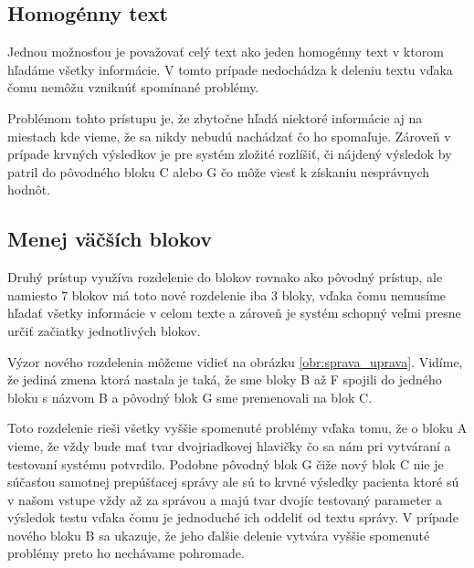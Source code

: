 \subsection{Homogénny text}

Jednou možnosťou je považovať celý text ako jeden homogénny text v ktorom hľadáme všetky informácie. V tomto prípade nedochádza k deleniu textu vďaka čomu nemôžu vzniknúť spomínané problémy. 

Problémom tohto prístupu je, že zbytočne hľadá niektoré informácie aj na miestach kde vieme, že sa nikdy nebudú nachádzať čo ho spomaľuje. Zároveň v prípade krvných výsledkov je pre systém zložité rozlíšiť, či nájdený výsledok by patril do pôvodného bloku C alebo G čo môže viesť k získaniu nesprávnych hodnôt.

\subsection{Menej väčších blokov}
\label{spravaLepsie}

Druhý prístup využíva rozdelenie do blokov rovnako ako pôvodný prístup, ale namiesto 7 blokov má toto nové rozdelenie iba 3 bloky, vďaka čomu nemusíme hľadať všetky informácie v celom texte a zároveň je systém schopný veľmi presne určiť začiatky jednotlivých blokov. 

Výzor nového rozdelenia môžeme vidieť na obrázku \ref{obr:sprava_uprava}. Vidíme, že jediná zmena ktorá nastala je taká, že sme bloky B až F spojili do jedného bloku s názvom B a pôvodný blok G sme premenovali na blok C. 

Toto rozdelenie rieši všetky vyššie spomenuté problémy vďaka tomu, že o bloku A vieme, že vždy bude mať tvar dvojriadkovej hlavičky čo sa nám pri vytváraní a testovaní systému potvrdilo. Podobne pôvodný blok G čiže nový blok C nie je súčasťou samotnej prepúšťacej správy ale sú to krvné výsledky pacienta ktoré sú v našom vstupe vždy až za správou a majú tvar dvojíc testovaný parameter a výsledok testu vďaka čomu je jednoduché ich oddeliť od textu správy. V prípade nového bloku B sa ukazuje, že jeho ďalšie delenie vytvára vyššie spomenuté problémy preto ho nechávame pohromade.

